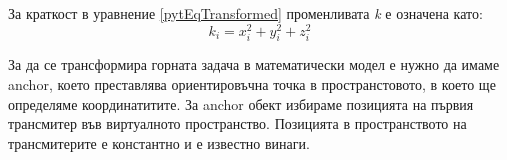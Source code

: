 За краткост в уравнение \ref{pytEqTransformed} променливата \textit{k} е означена като: 
\begin{equation} \label{kdesc}
    k_i= x^2_i + y^2_i + z^2_i
\end{equation}


За да се трансформира горната задача в математически модел е нужно да имаме anchor\cite{leastsq2}, което преставлява ориентировъчна точка в пространстовото, в което ще определяме координатитите. За anchor обект избираме позицията на първия трансмитер във виртуалното пространство. Позицията в пространството на трансмитерите е константно и е известно винаги.